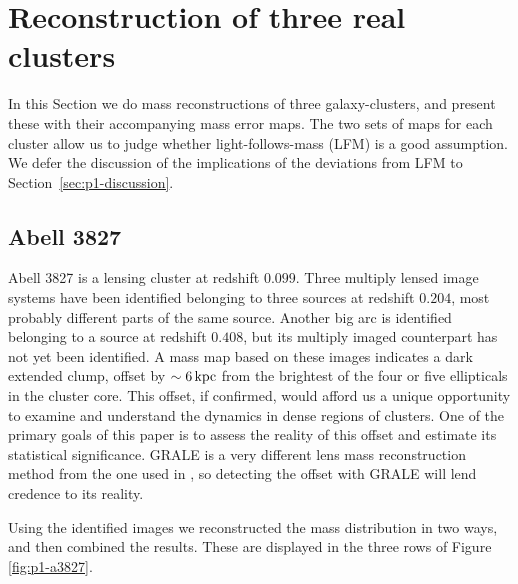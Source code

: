 \documentclass[
  11pt,
  twoside,
  openright,
  titlepage,
  headings=optiontoheadandtoc
]{scrbook}
\begin{document}
\clearpage

\section{Reconstruction of three real clusters}

In this Section we do mass reconstructions of three galaxy-clusters,
and present these with their accompanying mass error maps. The two
sets of maps for each cluster allow us to judge whether
light-follows-mass (LFM) is a good assumption. We defer the discussion
of the implications of the deviations from LFM to Section~\ref{sec:p1-discussion}.

\subsection{Abell 3827}

Abell 3827 is a lensing cluster at redshift $0.099$.  Three multiply
lensed image systems have been identified \citep{2010ApJ...715L.160C}
belonging to three sources at redshift $0.204$, most probably different
parts of the same source. Another big arc is identified belonging to a
source at redshift $0.408$, but its multiply imaged counterpart has not
yet been identified.  A mass map based on these images
\citep{2011MNRAS.415..448W} indicates a dark extended clump, offset by
$\sim 6\rm\,kpc$ from the brightest of the four or five ellipticals in
the cluster core. This offset, if confirmed, would afford us a unique
opportunity to examine and understand the dynamics in dense regions of
clusters.  One of the primary goals of this paper is to assess the
reality of this offset and estimate its statistical
significance. GRALE is a very different lens mass reconstruction
method from the one used in \cite{2011MNRAS.415..448W}, so detecting
the offset with GRALE will lend credence to its reality.

Using the identified images we reconstructed the mass distribution in
two ways, and then combined the results.  These are displayed in the
three rows of Figure \ref{fig:p1-a3827}.
\end{document}
